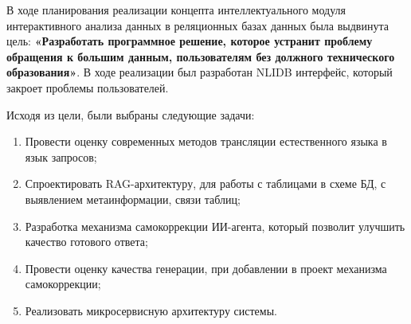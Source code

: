 
В ходе планирования реализации концепта интеллектуального модуля интерактивного анализа данных в реляционных базах данных была выдвинута цель: \textbf{«Разработать программное решение, которое устранит проблему обращения к большим данным, пользователям без должного технического образования»}. В ходе реализации был разработан NLIDB интерфейс, который закроет проблемы пользователей.

Исходя из цели, были выбраны следующие задачи:

\begin{enumerate}
    \item Провести оценку современных методов трансляции естественного языка в язык запросов;

    \item Спроектировать RAG-архитектуру, для работы с таблицами в схеме БД, с выявлением метаинформации, связи таблиц;

    \item Разработка механизма самокоррекции ИИ-агента, который позволит улучшить качество готового ответа;

    \item Провести оценку качества генерации, при добавлении в проект механизма самокоррекции;

    \item Реализовать микросервисную архитектуру системы.

\end{enumerate}
